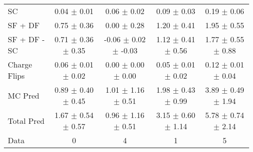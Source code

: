 \begin{tabular}{l|cccc}
                                 SC &  0.04 $\pm$  0.01 &  0.06 $\pm$  0.02 &  0.09 $\pm$  0.03 &  0.19 $\pm$  0.06 \\
                            SF + DF &  0.75 $\pm$  0.36 &  0.00 $\pm$  0.28 &  1.20 $\pm$  0.41 &  1.95 $\pm$  0.55 \\
\hline
                       SF + DF - SC &  0.71 $\pm$  0.36 $\pm$  0.35 & -0.06 $\pm$  0.02 $\pm$ -0.03 &  1.12 $\pm$  0.41 $\pm$  0.56 &  1.77 $\pm$  0.55 $\pm$  0.88 \\
\hline\hline
                       Charge Flips &  0.06 $\pm$  0.01 $\pm$  0.02 &  0.00 $\pm$  0.00 $\pm$  0.00 &  0.05 $\pm$  0.01 $\pm$  0.02 &  0.12 $\pm$  0.01 $\pm$  0.04 \\
\hline
                            MC Pred &  0.89 $\pm$  0.40 $\pm$  0.45 &  1.01 $\pm$  1.16 $\pm$  0.51 &  1.98 $\pm$  0.43 $\pm$  0.99 &  3.89 $\pm$  0.49 $\pm$  1.94 \\
\hline
                         Total Pred &  1.67 $\pm$  0.54 $\pm$  0.57 &  0.96 $\pm$  1.16 $\pm$  0.51 &  3.15 $\pm$  0.60 $\pm$  1.14 &  5.78 $\pm$  0.74 $\pm$  2.14 \\
\hline\hline
                               Data &     0 &     4 &     1 &     5 \\
\hline\hline
\end{tabular}

